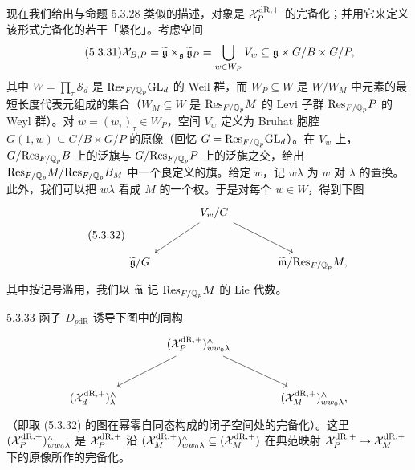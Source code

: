 现在我们给出与命题 5.3.28 类似的描述，对象是 $\mathcal{X}_P^{\mathrm{dR},+}$ 的完备化；并用它来定义该形式完备化的若干「紧化」。考虑空间
\begin{equation}\tag{5.3.31}\label{eq:a4-5-3-31}
\mathcal{X}_{B,P}=\widetilde{\mathfrak{g}}\times_{\mathfrak{g}}\widetilde{\mathfrak{g}}_P=\bigcup_{w\in W_P}V_w\subseteq\mathfrak{g}\times G/B\times G/P,
\end{equation}
其中 $W=\prod_\tau\mathcal{S}_d$ 是 $\mathrm{Res}_{F/\mathbb{Q}_p}\mathrm{GL}_d$ 的 Weil 群，而 $W_P\subseteq W$ 是 $W/W_M$ 中元素的最短长度代表元组成的集合（$W_M\subseteq W$ 是 $\mathrm{Res}_{F/\mathbb{Q}_p}M$ 的 Levi 子群 $\mathrm{Res}_{F/\mathbb{Q}_p}P$ 的 Weyl 群）。对 $w=(w_\tau)_\tau\in W_P$，空间 $V_w$ 定义为 Bruhat 胞腔 $G(1,w)\subseteq G/B\times G/P$ 的原像（回忆 $G=\mathrm{Res}_{F/\mathbb{Q}_p}\mathrm{GL}_d$）。在 $V_w$ 上，$G/\mathrm{Res}_{F/\mathbb{Q}_p}B$ 上的泛旗与 $G/\mathrm{Res}_{F/\mathbb{Q}_p}P$ 上的泛旗之交，给出 $\mathrm{Res}_{F/\mathbb{Q}_p}M/\mathrm{Res}_{F/\mathbb{Q}_p}B_M$ 中一个良定义的旗。给定 $w$，记 $w\lambda$ 为 $w$ 对 $\lambda$ 的置换。此外，我们可以把 $w\lambda$ 看成 $M$ 的一个权。于是对每个 $w\in W$，得到下图
\begin{equation}\tag{5.3.32}\label{eq:a4-5-3-32}
\begin{tikzcd}[row sep=large,column sep=large]
 & V_w/G\arrow[dl]\arrow[dr] & \\
 \wt{\frakg}/G & & \wt{\frakm}/\mathrm{Res}_{F/\Q_p}M,
\end{tikzcd}
\end{equation}
其中按记号滥用，我们以 $\widetilde{\mathfrak{m}}$ 记 $\mathrm{Res}_{F/\mathbb{Q}_p}M$ 的 Lie 代数。

\begin{prop}{5.3.33}\label{thm:a4-5-3-33}
函子 $D_{p\mathrm{dR}}$ 诱导下图中的同构
\[
\begin{tikzcd}[row sep=large,column sep=large]
 & (\XX_P^{\mathrm{dR},+})^{\wedge}_{ww_0\lambda}\arrow[dl]\arrow[dr] & \\
 (\XX_d^{\mathrm{dR},+})^{\wedge}_{\lambda} & & (\XX_M^{\mathrm{dR},+})^{\wedge}_{ww_0\lambda},
\end{tikzcd}
\]
（即取 (5.3.32) 的图在幂零自同态构成的闭子空间处的完备化）。这里 $(\mathcal{X}_P^{\mathrm{dR},+})^{\wedge}_{ww_0\lambda}$ 是 $\mathcal{X}_P^{\mathrm{dR},+}$ 沿 $(\mathcal{X}_M^{\mathrm{dR},+})^{\wedge}_{ww_0\lambda}\subseteq(\mathcal{X}_M^{\mathrm{dR},+})$ 在典范映射 $\mathcal{X}_P^{\mathrm{dR},+}\to\mathcal{X}_M^{\mathrm{dR},+}$ 下的原像所作的完备化。
\end{prop}

